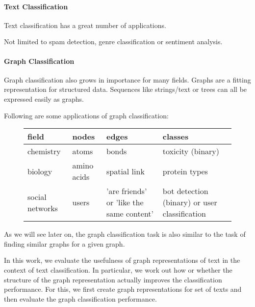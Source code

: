 

\paragraph{Text Classification}
Text classification has a great number of applications.

Not limited to spam detection, genre classification or sentiment analysis.

\paragraph{Graph Classification}
Graph classification also grows in importance for many fields.
Graphs are a fitting representation for structured data.
Sequences like strings/text or trees can all be expressed easily as graphs.

Following are some applications of graph classification:

\begin{figure}[ht]
\centering
\begin{tabular}{llll}
field & nodes & edges & classes \\
\midrule
chemistry & atoms & bonds & toxicity (binary) \\
biology & amino acids & spatial link & protein types \\ 
social networks & users & 'are friends' or 'like the same content' & bot detection (binary) or user classification
\end{tabular}
\end{figure}

As we will see later on, the graph classification task is also similar to the task of finding similar graphs for a given graph.

In this work, we evaluate the usefulness of graph representations of text in the context of text classification. In particular, we work out how or whether the structure of the graph representation actually improves the classification performance.
For this, we first create graph representations for set of texts and then evaluate the graph classification performance.

